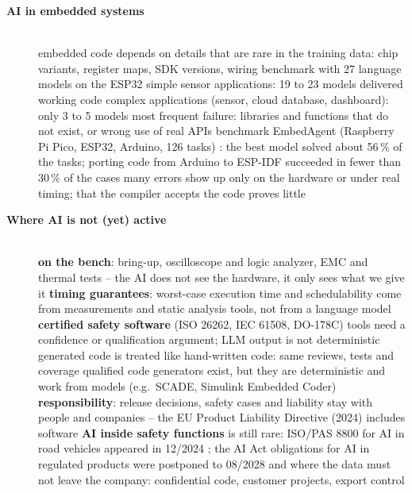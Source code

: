 \begin{description}
\item[{\rot\bf AI in embedded systems}]~\\[-\lblskip]
\bi
	\ite embedded code depends on details that are rare in the training data: chip variants, register maps, SDK versions, wiring
	\ite benchmark with 27 language models on the ESP32 \cite{babiuch2026}
	\bi
		\ite simple sensor applications: 19 to 23 models delivered working code
		\ite complex applications (sensor, cloud database, dashboard): only 3 to 5 models
		\ite most frequent failure: libraries and functions that do not exist, or wrong use of real APIs
	\ei
	\ite benchmark EmbedAgent (Raspberry Pi Pico, ESP32, Arduino, 126 tasks) \cite{xu2026embedagent}: the best model solved about 56\,\% of the tasks; porting code from Arduino to ESP-IDF succeeded in fewer than 30\,\% of the cases
	\ite many errors show up only on the hardware or under real timing; that the compiler accepts the code proves little
\ei
\os{\newpage}

\item[{\rot\bf Where AI is not (yet) active}]~\\[-\lblskip]
\bi
	\ite \textbf{on the bench}: bring-up, oscilloscope and logic analyzer, EMC and thermal tests -- the AI does not see the hardware, it only sees what we give it
	\ite \textbf{timing guarantees}: worst-case execution time and schedulability come from measurements and static analysis tools, not from a language model
	\ite \textbf{certified safety software} (ISO 26262, IEC 61508, DO-178C)
	\bi
		\ite tools need a confidence or qualification argument; LLM output is not deterministic
		\ite generated code is treated like hand-written code: same reviews, tests and coverage
		\ite qualified code generators exist, but they are deterministic and work from models (e.g.\ SCADE, Simulink Embedded Coder)
	\ei
	\ite \textbf{responsibility}: release decisions, safety cases and liability stay with people and companies -- the EU Product Liability Directive (2024) includes software
	\ite \textbf{AI inside safety functions} is still rare: ISO/PAS 8800 for AI in road vehicles appeared in 12/2024 \cite{iso8800}; the AI Act obligations for AI in regulated products were postponed to 08/2028 \cite{aiomnibus2026}
	\ite and where the data must not leave the company: confidential code, customer projects, export control
\ei
\os{\newpage}


\end{description}
